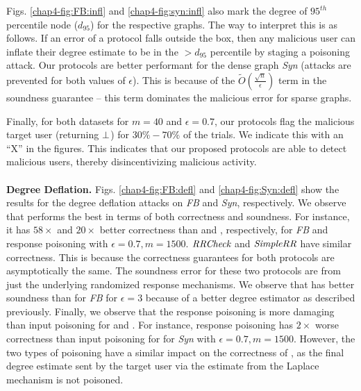 \par Figs. \ref{chap4-fig:FB:infl} and \ref{chap4-fig:syn:infl} also mark the degree of $95^{th}$ percentile node ($d_{95}$) for the respective graphs. The way to interpret this is as follows.  If an error of a protocol falls outside the box, then any malicious user can inflate their degree estimate to be in the $>d_{95}$ percentile by staging a poisoning attack. Our protocols are better performant for the dense graph \textit{Syn} (attacks are prevented for both values of $\epsilon$). This is because of the $\tilde{O}(\frac{\sqrt{n}}{\epsilon})$ term in the soundness guarantee -- this term dominates the malicious error for sparse graphs. 

\par Finally, for both datasets for $m=40$ and $\epsilon = 0.7$, our protocols flag the malicious target user (returning $\perp$) for $30\%-70\%$ of the trials.  We indicate this with an ``X'' in the figures. This indicates that our proposed protocols are able to detect malicious users, thereby disincentivizing malicious activity.
\vspace{-0.2cm}\\\\
\noindent\textbf{Degree Deflation.}
Figs. \ref{chap4-fig:FB:defl} and  \ref{chap4-fig:Syn:defl} show the results for the degree deflation attacks on  \textit{FB} and \textit{Syn}, respectively. We observe that \DegHybrid{} performs the best in terms of both correctness and soundness. For instance, it has $58\times$ and $20\times$ better correctness than \DegRRNaive{} and \DegRRCheck{}, respectively, for \textit{FB} and response poisoning with $\epsilon=0.7, m=1500$. $\textit{RRCheck}{}$ and $\textit{SimpleRR}{}$ have similar correctness. This is because the correctness guarantees for both protocols are asymptotically the same. %
The soundness error for these two protocols are from just the underlying randomized response mechanisms. We observe that \DegRRCheck{} has better soundness than  \DegRRNaive{} for \textit{FB} for $\epsilon=3$ because of a better degree estimator as described previously. Finally, we observe that the response poisoning is more damaging than input poisoning for \DegRRNaive{} and \DegRRCheck. For instance, response poisoning has $2\times$ worse correctness than input poisoning for \DegRRCheck{} for \textit{Syn} with $\epsilon=0.7,m=1500$. However, the two types of poisoning have a similar impact on the correctness of \DegHybrid{}, as the final degree estimate sent by the target user via the estimate from the Laplace mechanism is not poisoned.

